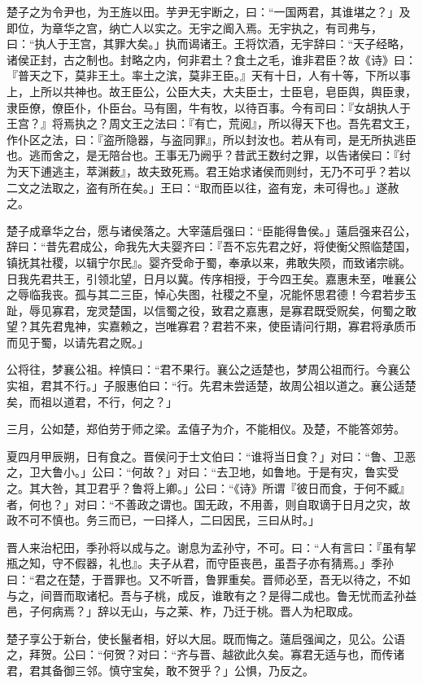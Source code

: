 \documentclass[]{article}
\begin{document}
楚子之为令尹也，为王旌以田。芋尹无宇断之，曰：``一国两君，其谁堪之？」及即位，为章华之宫，纳亡人以实之。无宇之阍入焉。无宇执之，有司弗与，曰：``执人于王宫，其罪大矣。」执而谒诸王。王将饮酒，无宇辞曰：``天子经略，诸侯正封，古之制也。封略之内，何非君土？食土之毛，谁非君臣？故《诗》曰：『普天之下，莫非王土。率土之滨，莫非王臣。』天有十日，人有十等，下所以事上，上所以共神也。故王臣公，公臣大夫，大夫臣士，士臣皂，皂臣舆，舆臣隶，隶臣僚，僚臣仆，仆臣台。马有圉，牛有牧，以待百事。今有司曰：『女胡执人于王宫？』将焉执之？周文王之法曰：『有亡，荒阅』，所以得天下也。吾先君文王，作仆区之法，曰：『盗所隐器，与盗同罪』，所以封汝也。若从有司，是无所执逃臣也。逃而舍之，是无陪台也。王事无乃阙乎？昔武王数纣之罪，以告诸侯曰：『纣为天下逋逃主，萃渊薮』，故夫致死焉。君王始求诸侯而则纣，无乃不可乎？若以二文之法取之，盗有所在矣。」王曰：``取而臣以往，盗有宠，未可得也。」遂赦之。

楚子成章华之台，愿与诸侯落之。大宰薳启强曰：``臣能得鲁侯。」薳启强来召公，辞曰：``昔先君成公，命我先大夫婴齐曰：『吾不忘先君之好，将使衡父照临楚国，镇抚其社稷，以辑宁尔民』。婴齐受命于蜀，奉承以来，弗敢失陨，而致诸宗祧。日我先君共王，引领北望，日月以冀。传序相授，于今四王矣。嘉惠未至，唯襄公之辱临我丧。孤与其二三臣，悼心失图，社稷之不皇，况能怀思君德！今君若步玉趾，辱见寡君，宠灵楚国，以信蜀之役，致君之嘉惠，是寡君既受贶矣，何蜀之敢望？其先君鬼神，实嘉赖之，岂唯寡君？君若不来，使臣请问行期，寡君将承质币而见于蜀，以请先君之贶。」

公将往，梦襄公祖。梓慎曰：``君不果行。襄公之适楚也，梦周公祖而行。今襄公实祖，君其不行。」子服惠伯曰：``行。先君未尝适楚，故周公祖以道之。襄公适楚矣，而祖以道君，不行，何之？」

三月，公如楚，郑伯劳于师之梁。孟僖子为介，不能相仪。及楚，不能答郊劳。

夏四月甲辰朔，日有食之。晋侯问于士文伯曰：``谁将当日食？」对曰：``鲁、卫恶之，卫大鲁小。」公曰：``何故？」对曰：``去卫地，如鲁地。于是有灾，鲁实受之。其大咎，其卫君乎？鲁将上卿。」公曰：``《诗》所谓『彼日而食，于何不臧』者，何也？」对曰：``不善政之谓也。国无政，不用善，则自取谪于日月之灾，故政不可不慎也。务三而已，一曰择人，二曰因民，三曰从时。」

晋人来治杞田，季孙将以成与之。谢息为孟孙守，不可。曰：``人有言曰：『虽有挈瓶之知，守不假器，礼也』。夫子从君，而守臣丧邑，虽吾子亦有猜焉。」季孙曰：``君之在楚，于晋罪也。又不听晋，鲁罪重矣。晋师必至，吾无以待之，不如与之，间晋而取诸杞。吾与子桃，成反，谁敢有之？是得二成也。鲁无忧而孟孙益邑，子何病焉？」辞以无山，与之莱、柞，乃迁于桃。晋人为杞取成。

楚子享公于新台，使长鬣者相，好以大屈。既而悔之。薳启强闻之，见公。公语之，拜贺。公曰：``何贺？对曰：``齐与晋、越欲此久矣。寡君无适与也，而传诸君，君其备御三邻。慎守宝矣，敢不贺乎？」公惧，乃反之。
\end{document}
